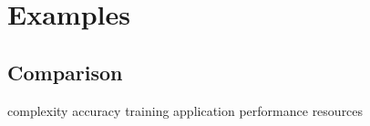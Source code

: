 \chapter{Examples}







\section{Comparison}
complexity
accuracy
training
application
performance
resources